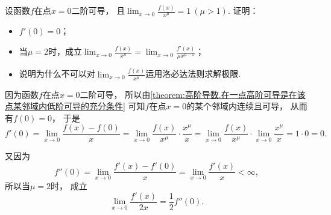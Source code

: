\begin{example}
设函数\(f\)在点\(x=0\)二阶可导，
且\(\lim_{x\to0} \frac{f(x)}{x^\mu} = 1\ (\mu>1)\).
证明：\begin{itemize}
	\item \(f'(0) = 0\)；
	\item 当\(\mu=2\)时，成立\(\lim_{x\to0} \frac{f(x)}{x^\mu}
	= \lim_{x\to0} \frac{f'(x)}{\mu x^{\mu-1}}\)；
	\item 说明为什么不可以对\(\lim_{x\to0} \frac{f(x)}{x^\mu}\)运用洛必达法则求解极限.
\end{itemize}
\begin{solution}
因为函数\(f\)在点\(x=0\)二阶可导，
所以由\cref{theorem:高阶导数.在一点高阶可导是在该点某邻域内低阶可导的充分条件}
可知\(f\)在点\(x=0\)的某个邻域内连续且可导，
从而有\(f(0) = 0\)，
于是\begin{equation*}
	f'(0) = \lim_{x\to0} \frac{f(x) - f(0)}{x}
	= \lim_{x\to0} \frac{f(x)}{x^\mu} \cdot \frac{x^\mu}{x}
	= \lim_{x\to0} \frac{f(x)}{x^\mu} \cdot \lim_{x\to0} \frac{x^\mu}{x}
	= 1 \cdot 0
	= 0.
\end{equation*}

又因为\begin{equation*}
	f''(0) = \lim_{x\to0} \frac{f'(x) - f'(0)}{x}
	= \lim_{x\to0} \frac{f'(x)}{x}
	< \infty,
\end{equation*}
所以当\(\mu=2\)时，
成立\begin{equation*}
	\lim_{x\to0} \frac{f'(x)}{2x}
	= \frac12 f''(0).
\end{equation*}


\end{solution}
\end{example}
